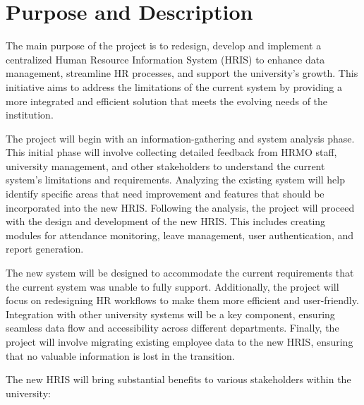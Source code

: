 \section{Purpose and Description}

    The main purpose of the project is to redesign, develop and implement a centralized Human Resource Information System (HRIS) to enhance data management, streamline HR processes, and support the university's growth. This initiative aims to address the limitations of the current system by providing a more integrated and efficient solution that meets the evolving needs of the institution.

    The project will begin with an information-gathering and system analysis phase. This initial phase will involve collecting detailed feedback from HRMO staff, university management, and other stakeholders to understand the current system's limitations and requirements. Analyzing the existing system will help identify specific areas that need improvement and features that should be incorporated into the new HRIS. Following the analysis, the project will proceed with the design and development of the new HRIS. This includes creating modules for attendance monitoring, leave management, user authentication, and report generation. 
    
    The new system will be designed to accommodate the current requirements that the current system was unable to fully support. Additionally, the project will focus on redesigning HR workflows to make them more efficient and user-friendly. Integration with other university systems will be a key component, ensuring seamless data flow and accessibility across different departments. Finally, the project will involve migrating existing employee data to the new HRIS, ensuring that no valuable information is lost in the transition.

    The new HRIS will bring substantial benefits to various stakeholders within the university:
    
